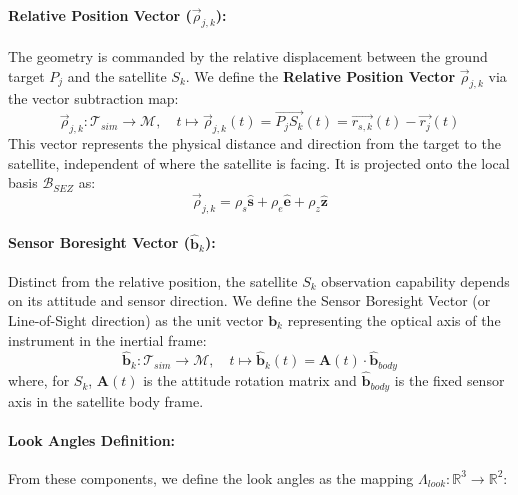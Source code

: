 \begin{table}[ht]
{\begin{itemize}
\paragraph{Relative Position Vector ($\vec{\rho}_{j,k}$):}
The geometry is commanded by the relative displacement between the ground target $P_j$ and the satellite $S_k$. We define the \textbf{Relative Position Vector}  $\vec{\rho}_{j,k}$ via the vector subtraction map:
\begin{equation}
    \vec{\rho}_{j,k} : \mathcal{T}_{sim} \to \mathcal{M}, \quad t \mapsto \vec{\rho}_{j,k}(t) = \overrightarrow{P_{j}S_{k}}(t) = \overrightarrow{r_{s,k}}(t) - \overrightarrow{r_{j}}(t)
\end{equation}
This vector represents the physical distance and direction from the target to the satellite, independent of where the satellite is facing. It is projected onto the local basis $\mathcal{B}_{SEZ}$ as:
\begin{equation}
    \vec{\rho}_{j,k} = \rho_s \hat{\mathbf{s}} + \rho_e \hat{\mathbf{e}} + \rho_z \hat{\mathbf{z}}
\end{equation}
\paragraph{Sensor Boresight Vector ($\hat{\mathbf{b}}_k$):}
Distinct from the relative position, the satellite $S_k$ observation capability depends on its attitude and sensor direction. We define the Sensor Boresight Vector (or Line-of-Sight direction) as the unit vector $\mathbf{b}_{k}$  representing the optical axis of the instrument in the inertial frame:
\begin{equation}
    \hat{\mathbf{b}}_{k} : \mathcal{T}_{sim} \to \mathcal{M}, \quad t \mapsto \hat{\mathbf{b}}_{k}(t) = \mathbf{A}(t) \cdot \hat{\mathbf{b}}_{body}
\end{equation}
where, for $S_k$, $\mathbf{A}(t)$ is the attitude rotation matrix and $\hat{\mathbf{b}}_{body}$ is the fixed sensor axis in the satellite body frame.

\paragraph{Look Angles Definition:}
From these components, we define the look angles as the mapping $\Lambda_{look}: \mathbb{R}^3 \to \mathbb{R}^2$:


\end{itemize}}
\end{table}
